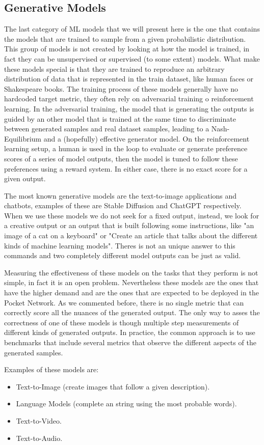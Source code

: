 \subsection{Generative Models}

The last category of ML models that we will present here is the one that contains the models that are trained to sample from a given probabilistic distribution. This group of models is not created by looking at how the model is trained, in fact they can be unsupervised or supervised (to some extent) models. What make these models special is that they are trained to reproduce an arbitrary distribution of data that is represented in the train dataset, like human faces or Shakespeare books. The training process of these models generally have no hardcoded target metric, they often rely on adversarial training o reinforcement learning. In the adversarial training, the model that is generating the outputs is guided by an other model that is trained at the same time to discriminate between generated samples and real dataset samples, leading to a Nash-Equilibrium and a (hopefully) effective generator model. On the reinforcement learning setup, a human is used in the loop to evaluate or generate preference scores of a series of model outputs, then the model is tuned to follow these preferences using a reward system. In either case, there is no exact score for a given output.

The most known generative models are the text-to-image applications and chatbots, examples of these are Stable Diffusion and ChatGPT respectively. When we use these models we do not seek for a fixed output, instead, we look for a creative output or an output that is built following some instructions, like "an image of a cat on a keyboard" or "Create an article that talks about the different kinds of machine learning models". Theres is not an unique answer to this commands and two completely different model outputs can be just as valid.

Measuring the effectiveness of these models on the tasks that they perform is not simple, in fact it is an open problem. Nevertheless these models are the ones that have the higher demand and are the ones that are expected to be deployed in the Pocket Network. As we commented before, there is no single metric that can correctly score all the nuances of the generated output. The only way to asses the correctness of one of these models is though multiple step measurements of different kinds of generated outputs. In practice, the common approach is to use benchmarks that include several metrics that observe the different aspects of the generated samples.


Examples of these models are:
\begin{itemize}
    \item Text-to-Image (create images that follow a given description).
    \item Language Models (complete an string using the most probable words).
    \item Text-to-Video.
    \item Text-to-Audio.
\end{itemize}


